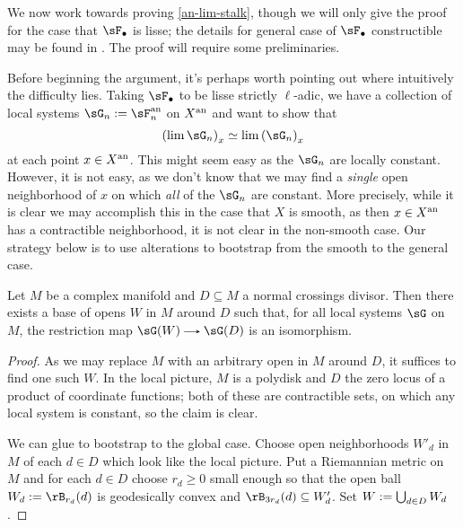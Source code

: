 \begin{nothing}
  \label{an-proof}
  We now work towards proving \cref{an-lim-stalk}, though we will only give the proof for the case that $\sF_\bullet$ is lisse; the details for general case of $\sF_\bullet$ constructible may be found in \cite[\S 1.4.7]{conrad-etale}. The proof will require some preliminaries.

  \begin{subremark}
    \label{an-proof-issue}
    Before beginning the argument, it's perhaps worth pointing out where intuitively the difficulty lies. Taking $\sF_\bullet$ to be lisse strictly $\ell$-adic, we have a collection of local systems $\sG_n \ce \sF_n^\an$ on $X^{\mathrm{an}}$ and want to show that
    \[
      \l(\lim \sG_n\r)_x \iso \lim {\l(\sG_n\r)_x}
    \]
    at each point $x \in X^{\mathrm{an}}$. This might seem easy as the $\sG_n$ are locally constant. However, it is not easy, as we don't know that we may find a \emph{single} open neighborhood of $x$ on which \emph{all} of the $\sG_n$ are constant. More precisely, while it is clear we may accomplish this in the case that $X$ is smooth, as then $x \in X^{\mathrm{an}}$ has a contractible neighborhood, it is not clear in the non-smooth case. Our strategy below is to use alterations to bootstrap from the smooth to the general case.
  \end{subremark}
  
  \begin{sublemma}
    \label{an-proof-smooth}
    Let $M$ be a complex manifold and $D \subseteq M$ a normal crossings divisor. Then there exists a base of opens $W$ in $M$ around $D$ such that, for all local systems $\sG$ on $M$, the restriction map $\sG(W) \to \sG(D)$ is an isomorphism.

    \begin{proof}
      As we may replace $M$ with an arbitrary open in $M$ around $D$, it suffices to find one such $W$. In the local picture, $M$ is a polydisk and $D$ the zero locus of a product of coordinate functions; both of these are contractible sets, on which any local system is constant, so the claim is clear.

      We can glue to bootstrap to the global case. Choose open neighborhoods $W'_d$ in $M$ of each $d \in D$ which look like the local picture. Put a Riemannian metric on $M$ and for each $d \in D$ choose $r_d \ge 0$ small enough so that the open ball $W_d \ce \rB_{r_d}(d)$ is geodesically convex and $\rB_{3r_d}(d) \subseteq W'_d$. Set $W \mathrel{:=} \bigcup_{d \in D} W_d$.


\end{proof}
\end{sublemma}
\end{nothing}
